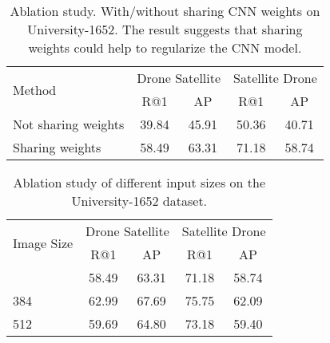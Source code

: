 \documentclass[sigconf]{acmart}
\begin{document}
\setlength{\tabcolsep}{9pt}
\begin{table}
\small
\begin{center}
\begin{tabular}{l|cc|cc}
\hline
\multirow{2}{*}{Method} & \multicolumn{2}{c|}{Drone  Satellite} & \multicolumn{2}{c}{Satellite  Drone}\\
  & R@1 & AP & R@1 & AP\\
\shline
Not sharing weights  & 39.84 & 45.91 & 50.36 & 40.71 \\
Sharing weights & 58.49 & 63.31 & 71.18 & 58.74 \\
\hline
\end{tabular}
\end{center}
\caption{Ablation study. With/without sharing CNN weights on University-1652. The result suggests that sharing weights could help to regularize the CNN model. }
\label{table:Share}
\end{table}

\setlength{\tabcolsep}{11pt}
\begin{table}
\small
\begin{center}
\begin{tabular}{l|cc|cc}
\hline
\multirow{2}{*}{Image Size}& \multicolumn{2}{c|}{Drone  Satellite} & \multicolumn{2}{c}{Satellite  Drone}\\
  & R@1 & AP & R@1 & AP\\
\shline
256 & 58.49 & 63.31 & 71.18 & 58.74 \\
384 & 62.99 & 67.69 & 75.75 & 62.09 \\
512 & 59.69 & 64.80 & 73.18 & 59.40 \\
\hline
\end{tabular}
\end{center}
\caption{Ablation study of different input sizes on the University-1652 dataset. 
}
\label{table:Size}
\end{table}
\end{document}
